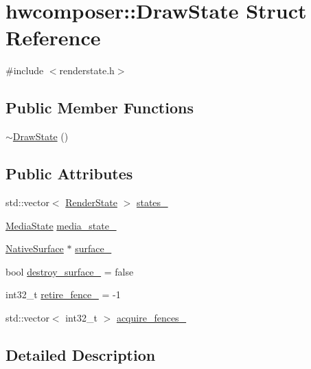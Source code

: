 \hypertarget{structhwcomposer_1_1DrawState}{}\section{hwcomposer\+:\+:Draw\+State Struct Reference}
\label{structhwcomposer_1_1DrawState}


{\ttfamily \#include $<$renderstate.\+h$>$}

\subsection*{Public Member Functions}
\begin{DoxyCompactItemize}
\item 
\mbox{\hyperlink{structhwcomposer_1_1DrawState_a26084dd9adbf3d49e554a2f332da65a4}{$\sim$\+Draw\+State}} ()
\end{DoxyCompactItemize}
\subsection*{Public Attributes}
\begin{DoxyCompactItemize}
\item 
std\+::vector$<$ \mbox{\hyperlink{structhwcomposer_1_1RenderState}{Render\+State}} $>$ \mbox{\hyperlink{structhwcomposer_1_1DrawState_ae756fae051e787e29f88e99817e47d9e}{states\+\_\+}}
\item 
\mbox{\hyperlink{structhwcomposer_1_1MediaState}{Media\+State}} \mbox{\hyperlink{structhwcomposer_1_1DrawState_a6eb63ee2e16ae80dd4fec5bc8338b95a}{media\+\_\+state\+\_\+}}
\item 
\mbox{\hyperlink{classhwcomposer_1_1NativeSurface}{Native\+Surface}} $\ast$ \mbox{\hyperlink{structhwcomposer_1_1DrawState_a4d54482d23b17eb7da0dab3be1fa2e52}{surface\+\_\+}}
\item 
bool \mbox{\hyperlink{structhwcomposer_1_1DrawState_a68f9831f1f9dcfc09ec71fe1ddd50ce4}{destroy\+\_\+surface\+\_\+}} = false
\item 
int32\+\_\+t \mbox{\hyperlink{structhwcomposer_1_1DrawState_ab8ef923f9bdefc5965a143656b3fe188}{retire\+\_\+fence\+\_\+}} = -\/1
\item 
std\+::vector$<$ int32\+\_\+t $>$ \mbox{\hyperlink{structhwcomposer_1_1DrawState_aa711cbfc5683b64a5d9dec5e0d997427}{acquire\+\_\+fences\+\_\+}}
\end{DoxyCompactItemize}


\subsection{Detailed Description}


